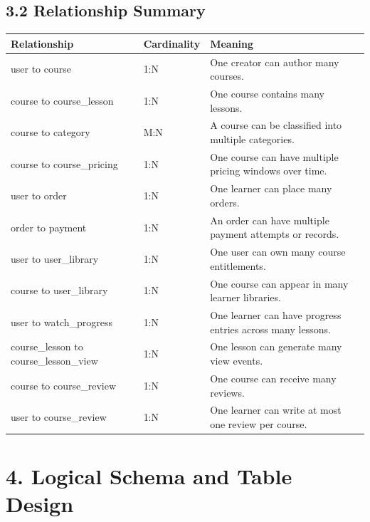 \documentclass[11pt,a4paper]{article}
\begin{document}
\subsection*{3.2 Relationship Summary}
\begin{tabularx}{\textwidth}{L{3.2cm}L{2.0cm}Y}
\toprule
\textbf{Relationship} & \textbf{Cardinality} & \textbf{Meaning} \\
\midrule
user to course & 1:N & One creator can author many courses. \\
course to course\_lesson & 1:N & One course contains many lessons. \\
course to category & M:N & A course can be classified into multiple categories. \\
course to course\_pricing & 1:N & One course can have multiple pricing windows over time. \\
user to order & 1:N & One learner can place many orders. \\
order to payment & 1:N & An order can have multiple payment attempts or records. \\
user to user\_library & 1:N & One user can own many course entitlements. \\
course to user\_library & 1:N & One course can appear in many learner libraries. \\
user to watch\_progress & 1:N & One learner can have progress entries across many lessons. \\
course\_lesson to course\_lesson\_view & 1:N & One lesson can generate many view events. \\
course to course\_review & 1:N & One course can receive many reviews. \\
user to course\_review & 1:N & One learner can write at most one review per course. \\
\bottomrule
\end{tabularx}

\section*{4. Logical Schema and Table Design}
\end{document}
